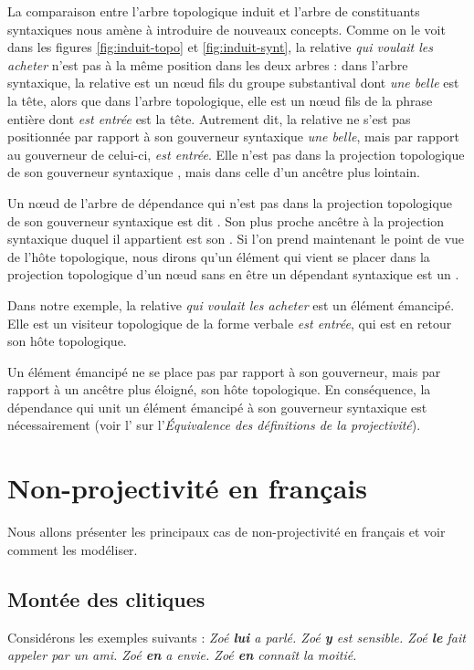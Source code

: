 La comparaison entre l’arbre topologique induit et l’arbre de constituants syntaxiques nous amène à introduire de nouveaux concepts. 
Comme on le voit dans les figures \ref{fig:induit-topo} et \ref{fig:induit-synt}, la relative \textit{qui voulait les acheter} n’est pas à la même position dans les deux arbres : dans l’arbre syntaxique, la relative est un nœud fils du groupe substantival dont \textit{une belle} est la tête, alors que dans l’arbre topologique, elle est un nœud fils de la phrase entière dont \textit{est entrée} est la tête. Autrement dit, la relative ne s’est pas positionnée par rapport à son gouverneur syntaxique \textit{une belle}, mais par rapport au gouverneur de celui-ci, \textit{est entrée}. Elle n'est pas dans la projection topologique de son gouverneur syntaxique , mais dans celle d'un ancêtre plus lointain.

{Un nœud de l'arbre de dépendance qui n'est pas dans la projection topologique de son gouverneur syntaxique est dit . Son plus proche ancêtre à la projection syntaxique duquel il appartient est son . Si l’on prend maintenant le point de vue de l’hôte topologique, nous dirons qu’un élément qui vient se placer dans la projection topologique d'un nœud sans en être un dépendant syntaxique est un .}

Dans notre exemple, la relative \textit{qui voulait les acheter} est un élément émancipé. Elle est un visiteur topologique de la forme verbale \textit{est entrée}, qui est en retour son hôte topologique.

Un élément émancipé ne se place pas par rapport à son gouverneur, mais par rapport à un ancêtre plus éloigné, son hôte topologique. 
En conséquence, la dépendance qui unit un élément émancipé à son gouverneur syntaxique est nécessairement  (voir l’ sur l’\textit{Équivalence des définitions de la projectivité}).


\section{Non-projectivité en français}\label{sec:3.5.32}

Nous allons présenter les principaux cas de non-projectivité en français et voir comment les modéliser.

\subsection{Montée des clitiques}
Considérons les exemples suivants :
\ea
\ea \itshape Zoé \textbf{lui} a parlé.
\ex \itshape Zoé \textbf{y}   est sensible.
\ex \itshape Zoé \textbf{le}  fait appeler par un ami.
\ex \itshape Zoé \textbf{en}  a envie.
\ex \itshape Zoé \textbf{en}  connaît la moitié.
\z
\z

